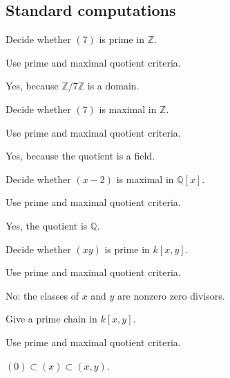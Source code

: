 \subsection*{Standard computations}

\begin{exercise}\label{exr:v02-expand-01}
Decide whether $(7)$ is prime in $\mathbb Z$.
\end{exercise}
\begin{hint}
Use prime and maximal quotient criteria.
\end{hint}
\begin{solution}
Yes, because $\mathbb Z/7\mathbb Z$ is a domain.
\end{solution}

\begin{exercise}\label{exr:v02-expand-02}
Decide whether $(7)$ is maximal in $\mathbb Z$.
\end{exercise}
\begin{hint}
Use prime and maximal quotient criteria.
\end{hint}
\begin{solution}
Yes, because the quotient is a field.
\end{solution}

\begin{exercise}\label{exr:v02-expand-03}
Decide whether $(x-2)$ is maximal in $\mathbb Q[x]$.
\end{exercise}
\begin{hint}
Use prime and maximal quotient criteria.
\end{hint}
\begin{solution}
Yes, the quotient is $\mathbb Q$.
\end{solution}

\begin{exercise}\label{exr:v02-expand-04}
Decide whether $(xy)$ is prime in $k[x,y]$.
\end{exercise}
\begin{hint}
Use prime and maximal quotient criteria.
\end{hint}
\begin{solution}
No: the classes of $x$ and $y$ are nonzero zero divisors.
\end{solution}

\begin{exercise}\label{exr:v02-expand-05}
Give a prime chain in $k[x,y]$.
\end{exercise}
\begin{hint}
Use prime and maximal quotient criteria.
\end{hint}
\begin{solution}
$(0)\subset(x)\subset(x,y)$.
\end{solution}

